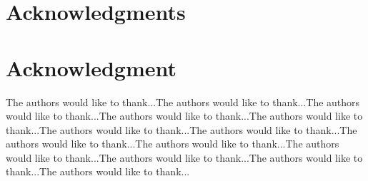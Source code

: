 \documentclass[10pt,journal,cspaper,compsoc]{IEEEtran}
\begin{document}
\ifCLASSOPTIONcompsoc
  \section*{Acknowledgments}
\else
  \section*{Acknowledgment}
\fi


The authors would like to thank...The authors would like to thank...The authors would like to thank...The authors would like to thank...The authors would like to thank...The authors would like to thank...The authors would like to thank...The authors would like to thank...The authors would like to thank...The authors would like to thank...The authors would like to thank...The authors would like to thank...The authors would like to thank...


\ifCLASSOPTIONcaptionsoff
  \newpage
\fi








%
%
%

\end{document}
